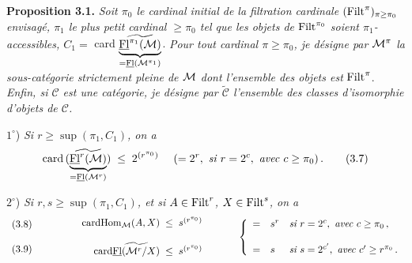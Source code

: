 \textbf{Proposition 3.1.} \textit{Soit $\pi_0$ le cardinal initial de la filtration cardinale} $(\mathrm{Filt}^\pi)_{\pi\geq\pi_0}$ \textit{envisagé, $\pi_1$ le plus petit cardinal $\geq\pi_0$ tel que les objets de} $\mathrm{Filt}^{\pi_0}$ \textit{soient $\pi_1$-accessibles, $C_1=$} card $\underbrace{\widetilde{\underline{\mathrm{Fl}}^{\pi_1}(\mathcal{M})}}_{=\underline{\mathrm{Fl}}(\mathcal{M}^{\pi_1})}$. \textit{Pour tout cardinal $\pi\geq\pi_0$, je désigne par $\mathcal{M}^\pi$ la sous-catégorie strictement pleine de $\mathcal{M}$ dont l'ensemble des objets est} $\mathrm{Filt}^\pi$. \textit{Enfin, si $\mathcal{C}$ est une catégorie, je désigne par $\widetilde{\mathcal{C}}$ l'ensemble des classes d'isomorphie d'objets de $\mathcal{C}$.}

$1^\circ$) \textit{Si $r\geq\sup(\pi_1,C_1)$, on a}
\[
\card\,(\underbrace{\widetilde{\uFl^r(\cM)}}_{=\uFl(\cM^r)}) \;\leq\; 2^{(r^{\pi_0})} \quad\ (=2^r,\ \textit{si } r=2^c,\ \textit{avec } c\geq\pi_0)\,.
\tag*{(3.7)}
\]

$2^\circ$) \textit{Si $r,s\geq\sup(\pi_1,C_1)$, et si $A\in\mathrm{Filt}^r$, $X\in\mathrm{Filt}^s$, on a}
\[
\begin{array}{l}
\text{(3.8)}\\[3ex]
\text{(3.9)}
\end{array}
\qquad\qquad
\begin{array}{r@{\;\;\leq\;\;}l}
\card\mathrm{Hom}_{\cM}(A,X) & s^{(r^{\pi_0})}\\[3ex]
\card\widetilde{\uFl(\cM^r/X)} & s^{(r^{\pi_0})}
\end{array}
\qquad\quad
\left\{
\begin{array}{lll}
= & s^r & \textit{si } r=2^c,\ \textit{avec } c\geq\pi_0\,,\\[3ex]
= & s & \textit{si } s=2^{c'},\ \textit{avec } c'\geq r^{\pi_0}\,.
\end{array}
\right.
\]

